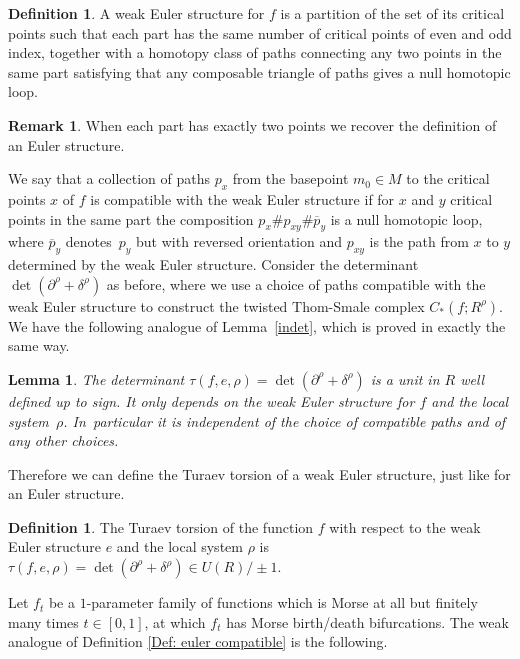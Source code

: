 \documentclass[JEP,XML,SOM,Unicode,NoFloatCountersInSection]{cedram}
\theoremstyle{plain}
\newtheorem{lemma}[theorem]{Lemma}
\theoremstyle{definition}
\newtheorem{definition}[theorem]{Definition}
\newtheorem{remark}[theorem]{Remark}
\begin{document}
\begin{definition}\label{Definition: weak} A weak Euler structure for $f$ is a partition of the set of its critical points such that each part has the same number of critical points of even and odd index, together with a homotopy class of paths connecting any two points in the same part satisfying that any composable triangle of paths gives a null homotopic loop.
\end{definition}

\begin{remark} When each part has exactly two points we recover the definition of an Euler structure.
\end{remark}

We say that a collection of paths $p_x$ from the basepoint $m_0\in M$ to the critical points $x$ of $f$ is compatible with the weak Euler structure if for $x$ and $y$ critical points in the same part the composition $p_x \# p_{xy} \# \overline{p}_y $ is a null homotopic loop, where $\overline{p}_y$ denotes~$p_y$ but with reversed orientation and $p_{xy}$ is the path from $x$ to $y$ determined by the weak Euler structure. Consider the determinant $\det(\partial^\rho + \delta^\rho)$ as before, where we use a choice of paths compatible with the weak Euler structure to construct the twisted Thom-Smale complex $C_*(f; R^\rho)$. We have the following analogue of Lemma~\ref{indet}, which is proved in exactly the same way.

\begin{lemma}\label{weakindet}
The determinant $\tau(f,e,\rho)=\det(\partial^\rho + \delta^\rho)$ is a unit in $R$ well defined up to sign. It only depends on the weak Euler structure for $f$ and the local system~$\rho$. In~particular it is independent of the choice of compatible paths and of any other choices.
\end{lemma}

Therefore we can define the Turaev torsion of a weak Euler structure, just like for an Euler structure.

\begin{definition}
The Turaev torsion of the function $f$ with respect to the weak Euler structure $e$ and the local system $\rho$ is $\tau(f, e, \rho)=\det(\partial^\rho + \delta^\rho) \in U(R) / \pm 1$.
\end{definition}

Let $f_t$ be a $1$-parameter family of functions which is Morse at all but finitely many times $t \in [0,1]$, at which $f_t$ has Morse birth/death bifurcations. The weak analogue of Definition \ref{Def: euler compatible} is the following.
\end{document}
